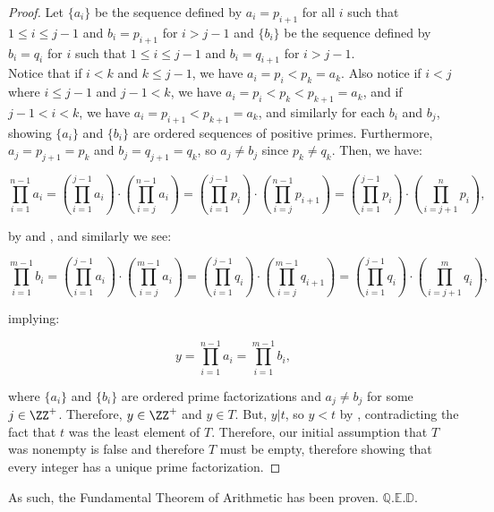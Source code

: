 \begin{proof}
Let $\{ a_i \}$ be the sequence defined by $a_i = p_{i+1}$ for all $i$ such that $1 \le i \le j-1$ and $b_i = p_{i+1}$ for $i > j-1$ and $\{ b_i \} $ be the sequence defined by $b_i = q_i$ for $i$ such that $1 \le i \le j-1$ and $b_i = q_{i+1}$ for $i > j-1$. \\

Notice that if $i <k$ and $k \le j-1$, we have $a_i = p_i < p_k = a_k$. Also notice if $i < j$ where $i \le j-1$ and $j-1 < k$, we have $a_i = p_i < p_{k} < p_{k+1} = a_k$, and if $j-1 < i < k$, we have $a_i = p_{i+1} < p_{k+1} = a_k$, and similarly for each $b_i$ and $b_j$, showing $\{ a_i \}$ and $\{b_i\}$ are ordered sequences of positive primes. Furthermore, $a_j = p_{j+1} = p_k$ and $b_j = q_{j+1} = q_k$, so $a_j \neq b_j$ since $p_k \neq q_k$. Then, we have:

\begin{equation*}
    \prod_{i=1}^{n-1} a_i = \left( \prod_{i=1}^{j-1} a_i \right) \cdot \left( \prod_{i=j}^{n-1} a_i \right) = \left( \prod_{i=1}^{j-1} p_i \right) \cdot \left( \prod_{i=j}^{n-1} p_{i+1} \right) =  \left( \prod_{i=1}^{j-1} p_i \right) \cdot \left( \prod_{i=j+1}^{n} p_{i} \right),
\end{equation*}

by  and , and similarly we see:

\begin{equation*}
\prod_{i=1}^{m-1} b_i = \left( \prod_{i=1}^{j-1} a_i \right) \cdot \left( \prod_{i=j}^{m-1} a_i \right) = \left( \prod_{i=1}^{j-1} q_i \right) \cdot \left( \prod_{i=j}^{m-1} q_{i+1} \right) =  \left( \prod_{i=1}^{j-1} q_i \right) \cdot \left( \prod_{i=j+1}^{m} q_{i} \right),
\end{equation*}

implying:

\begin{equation*}
    y = \prod_{i=1}^{n-1} a_i = \prod_{i=1}^{m-1} b_i,
\end{equation*}

where $\{a_i\}$ and $\{b_i\}$ are ordered prime factorizations and $a_j \neq b_j$ for some $j \in \ZZ^+$. Therefore, $y \in \ZZ^+$ and $y \in T$. But, $y | t$, so $y < t$ by , contradicting the fact that $t$ was the least element of $T$. Therefore, our initial assumption that $T$ was nonempty is false and therefore $T$ must be empty, therefore showing that every integer has a unique prime factorization.
\end{proof} 
As such, the Fundamental Theorem of Arithmetic has been proven. $\mathbb{Q.E.D.}$
